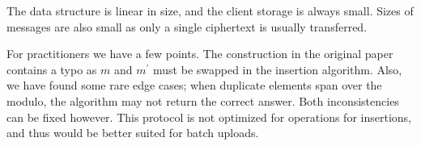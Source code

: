 		The data structure is linear in size, and the client storage is always small.
		Sizes of messages are also small as only a single ciphertext is usually transferred.

		For practitioners we have a few points.
		The construction in the original paper~\cite{florian-protocol} contains a typo as $m$ and $m^\prime$ must be swapped in the insertion algorithm.
		Also, we have found some rare edge cases; when duplicate elements span over the modulo, the algorithm may not return the correct answer.
		Both inconsistencies can be fixed however.
		This protocol is not optimized for {\IO} operations for insertions, and thus would be better suited for batch uploads.
